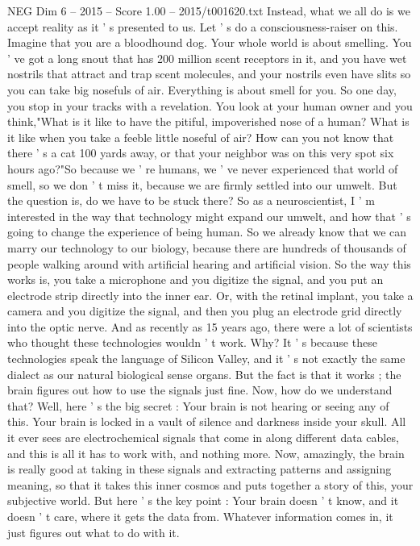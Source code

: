 \begin{textsample}{NEG Dim 6 – 2015 – Score 1.00 – 2015/t001620.txt}
Instead, what we all do is we accept reality as it ' s presented to us.
Let ' s do a consciousness-raiser on this.
Imagine that you are a bloodhound dog.
Your whole world is about smelling.
You ' ve got a long snout that has 200 million scent receptors in it, and you have wet nostrils that attract and trap scent molecules, and your nostrils even have slits so you can take big nosefuls of air.
Everything is about smell for you.
So one day, you stop in your tracks with a revelation.
You look at your human owner and you think,"What is it like to have the pitiful, impoverished nose of a human?
What is it like when you take a feeble little noseful of air?
How can you not know that there ' s a cat 100 yards away, or that your neighbor was on this very spot six hours ago?"So because we ' re humans, we ' ve never experienced that world of smell, so we don ' t miss it, because we are firmly settled into our umwelt.
But the question is, do we have to be stuck there?
So as a neuroscientist, I ' m interested in the way that technology might expand our umwelt, and how that ' s going to change the experience of being human.
So we already know that we can marry our technology to our biology, because there are hundreds of thousands of people walking around with artificial hearing and artificial vision.
So the way this works is, you take a microphone and you digitize the signal, and you put an electrode strip directly into the inner ear.
Or, with the retinal implant, you take a camera and you digitize the signal, and then you plug an electrode grid directly into the optic nerve.
And as recently as 15 years ago, there were a lot of scientists who thought these technologies wouldn ' t work.
Why?
It ' s because these technologies speak the language of Silicon Valley, and it ' s not exactly the same dialect as our natural biological sense organs.
But the fact is that it works ; the brain figures out how to use the signals just fine.
Now, how do we understand that?
Well, here ' s the big secret : Your brain is not hearing or seeing any of this.
Your brain is locked in a vault of silence and darkness inside your skull.
All it ever sees are electrochemical signals that come in along different data cables, and this is all it has to work with, and nothing more.
Now, amazingly, the brain is really good at taking in these signals and extracting patterns and assigning meaning, so that it takes this inner cosmos and puts together a story of this, your subjective world.
But here ' s the key point : Your brain doesn ' t know, and it doesn ' t care, where it gets the data from.
Whatever information comes in, it just figures out what to do with it.

\end{textsample}
